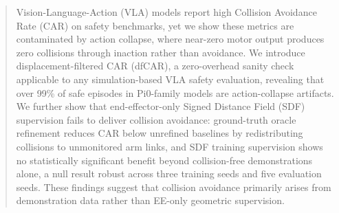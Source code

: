 \begin{abstract}
Vision-Language-Action (VLA) models report high Collision Avoidance Rate (CAR) on safety benchmarks, yet we show these metrics are contaminated by action collapse, where near-zero motor output produces zero collisions through inaction rather than avoidance. We introduce displacement-filtered CAR (dfCAR), a zero-overhead sanity check applicable to any simulation-based VLA safety evaluation, revealing that over 99\% of safe episodes in Pi0-family models are action-collapse artifacts. We further show that end-effector-only Signed Distance Field (SDF) supervision fails to deliver collision avoidance: ground-truth oracle refinement reduces CAR below unrefined baselines by redistributing collisions to unmonitored arm links, and SDF training supervision shows no statistically significant benefit beyond collision-free demonstrations alone, a null result robust across three training seeds and five evaluation seeds. These findings suggest that collision avoidance primarily arises from demonstration data rather than EE-only geometric supervision.
\end{abstract}
